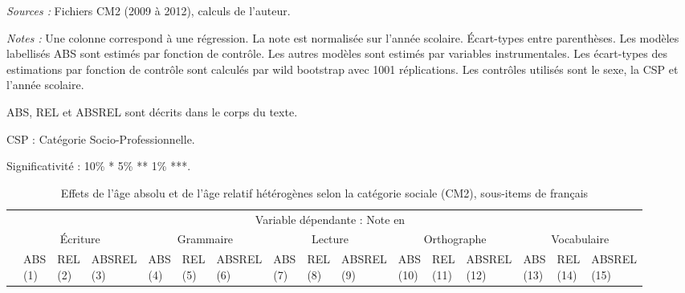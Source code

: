 \documentclass[
]{book}
\begin{document}
\begin{ThreePartTable}
\begin{TableNotes}
\item \textit{Sources :} Fichiers CM2 (2009 à 2012), calculs de l'auteur.
\item \textit{Notes :} Une colonne correspond à une régression. La note est normalisée sur l'année scolaire. Écart-types entre parenthèses. Les modèles labellisés ABS sont estimés par fonction de contrôle. Les autres modèles sont estimés par variables instrumentales. Les écart-types des estimations par fonction de contrôle sont calculés par wild bootstrap avec 1001 réplications. Les contrôles utilisés sont le sexe, la CSP et l'année scolaire.
\item ABS, REL et ABSREL sont décrits dans le corps du texte.
\item CSP : Catégorie Socio-Professionnelle.
\item Significativité : 10\% * 5\% ** 1\% ***.
\end{TableNotes}
\begin{longtable}[t]{llllllllllllllll}
\caption{\label{tab:agemodelsrelpcsssitemsfrench}Effets de l'âge absolu et de l'âge relatif hétérogènes selon la catégorie sociale (CM2), sous-items de français}\\
\toprule
\multicolumn{1}{c}{} & \multicolumn{15}{c}{Variable dépendante : Note en } \\
\cmidrule(l{3pt}r{3pt}){2-16}
\multicolumn{1}{c}{} & \multicolumn{3}{c}{Écriture} & \multicolumn{3}{c}{Grammaire} & \multicolumn{3}{c}{Lecture} & \multicolumn{3}{c}{Orthographe} & \multicolumn{3}{c}{Vocabulaire} \\
\cmidrule(l{3pt}r{3pt}){2-4} \cmidrule(l{3pt}r{3pt}){5-7} \cmidrule(l{3pt}r{3pt}){8-10} \cmidrule(l{3pt}r{3pt}){11-13} \cmidrule(l{3pt}r{3pt}){14-16}
 & \makecell{ABS \\ (1) } & \makecell{REL \\ (2) } & \makecell{ABSREL \\ (3) } & \makecell{ABS \\ (4) } & \makecell{REL \\ (5) } & \makecell{ABSREL \\ (6) } & \makecell{ABS \\ (7) } & \makecell{REL \\ (8) } & \makecell{ABSREL \\ (9) } & \makecell{ABS \\ (10) } & \makecell{REL \\ (11) } & \makecell{ABSREL \\ (12) } & \makecell{ABS \\ (13) } & \makecell{REL \\ (14) } & \makecell{ABSREL \\ (15) }\\

\end{longtable}
\end{ThreePartTable}
\end{document}
